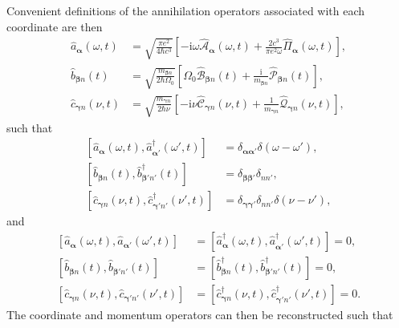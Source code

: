 \documentclass{article}
\begin{document}
Convenient definitions of the annihilation operators associated with each coordinate are then
\begin{equation}
\begin{split}
\hat{a}_{\bm{\alpha}}(\omega,t) &= \sqrt{\frac{\pi e^2}{4\hbar c^3}}\left[-\mathrm{i}\omega\hat{\mathcal{A}}_{\bm{\alpha}}(\omega,t) + \frac{2c^3}{\pi e^2\omega}\hat{\mathit{\Pi}}_{\bm{\alpha}}(\omega,t)\right],\\
\hat{b}_{\bm{\beta}n}(t) &= \sqrt{\frac{m_{\bm{\beta}n}}{2\hbar\Omega_0}}\left[\Omega_0\hat{\mathcal{B}}_{\bm{\beta}n}(t) + \frac{\mathrm{i}}{m_{\bm{\beta}n}}\hat{\mathcal{P}}_{\bm{\beta}n}(t)\right],\\
\hat{c}_{\bm{\gamma}n}(\nu,t) &= \sqrt{\frac{m_{\bm{\gamma}n}}{2\hbar\nu}}\left[-\mathrm{i}\nu\hat{\mathcal{C}}_{\bm{\gamma}n}(\nu,t) + \frac{1}{m_{\bm{\gamma}n}}\hat{\mathcal{Q}}_{\bm{\gamma}n}(\nu,t)\right],
\end{split}
\end{equation}
such that
\begin{equation}
\begin{split}
\left[\hat{a}_{\bm{\alpha}}(\omega,t),\hat{a}_{\bm{\alpha}'}^\dagger(\omega',t)\right] &= \delta_{\bm{\alpha}\bm{\alpha}'}\delta(\omega - \omega'),\\
\left[\hat{b}_{\bm{\beta}n}(t),\hat{b}_{\bm{\beta}'n'}^\dagger(t)\right] &= \delta_{\bm{\beta}\bm{\beta}'}\delta_{nn'},\\
\left[\hat{c}_{\bm{\gamma}n}(\nu,t),\hat{c}_{\bm{\gamma}'n'}^\dagger(\nu',t)\right] &= \delta_{\bm{\gamma}\bm{\gamma}'}\delta_{nn'}\delta(\nu - \nu'),
\end{split}
\end{equation}
and
\begin{equation}
\begin{split}
\left[\hat{a}_{\bm{\alpha}}(\omega,t),\hat{a}_{\bm{\alpha}'}(\omega',t)\right] &= \left[\hat{a}_{\bm{\alpha}}^\dagger(\omega,t),\hat{a}_{\bm{\alpha}'}^\dagger(\omega',t)\right] = 0,\\
\left[\hat{b}_{\bm{\beta}n}(t),\hat{b}_{\bm{\beta}'n'}(t)\right] &= \left[\hat{b}_{\bm{\beta}n}^\dagger(t),\hat{b}_{\bm{\beta}'n'}^\dagger(t)\right] = 0,\\
\left[\hat{c}_{\bm{\gamma}n}(\nu,t),\hat{c}_{\bm{\gamma}'n'}(\nu',t)\right] &= \left[\hat{c}_{\bm{\gamma}n}^\dagger(\nu,t),\hat{c}_{\bm{\gamma}'n'}^\dagger(\nu',t)\right] = 0.
\end{split}
\end{equation}
The coordinate and momentum operators can then be reconstructed such that
\end{document}
